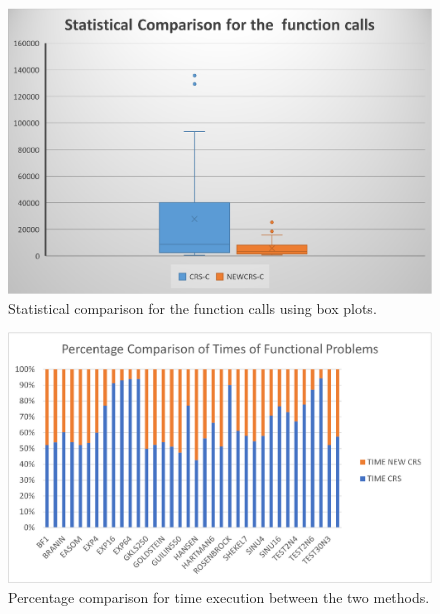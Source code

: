 \documentclass[symmetry,article,submit,moreauthors,pdftex]{Definitions/mdpi}
\begin{document}
\begin{figure}
\caption{Statistical comparison for the function calls using box plots.\\ \label{fig:Statistical-comparison-for}}

\begin{centering}
\includegraphics[scale=0.7]{values}
\par\end{centering}
\end{figure}


\begin{figure}
\caption{Percentage comparison for time execution between the two methods.\\ \label{fig:TimeComparisonPercentage}}

\begin{centering}
\includegraphics[scale=0.7]{graph_time}
\par\end{centering}
\end{figure}
\end{document}
